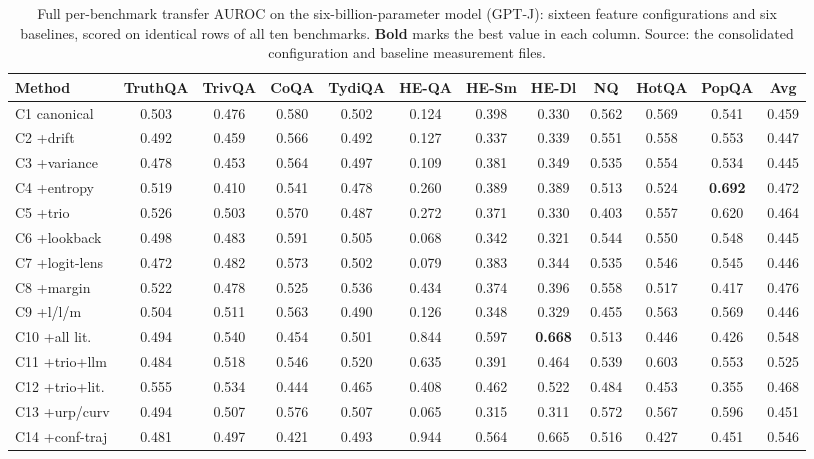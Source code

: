 \begin{table}[h]
\centering
\caption{Full per-benchmark transfer AUROC on the six-billion-parameter model (GPT-J): sixteen feature configurations and six baselines, scored on identical rows of all ten benchmarks. \textbf{Bold} marks the best value in each column. Source: the consolidated configuration and baseline measurement files.}
\label{tab:app-gptj-full}
\footnotesize
\setlength{\tabcolsep}{3.2pt}
\begin{tabular}{lcccccccccc|c}
\toprule
Method & TruthQA & TrivQA & CoQA & TydiQA & HE-QA & HE-Sm & HE-Dl & NQ & HotQA & PopQA & Avg \\
\midrule
C1 canonical & 0.503 & 0.476 & 0.580 & 0.502 & 0.124 & 0.398 & 0.330 & 0.562 & 0.569 & 0.541 & 0.459 \\
C2 {+}drift & 0.492 & 0.459 & 0.566 & 0.492 & 0.127 & 0.337 & 0.339 & 0.551 & 0.558 & 0.553 & 0.447 \\
C3 {+}variance & 0.478 & 0.453 & 0.564 & 0.497 & 0.109 & 0.381 & 0.349 & 0.535 & 0.554 & 0.534 & 0.445 \\
C4 {+}entropy & 0.519 & 0.410 & 0.541 & 0.478 & 0.260 & 0.389 & 0.389 & 0.513 & 0.524 & \textbf{0.692} & 0.472 \\
C5 {+}trio & 0.526 & 0.503 & 0.570 & 0.487 & 0.272 & 0.371 & 0.330 & 0.403 & 0.557 & 0.620 & 0.464 \\
C6 {+}lookback & 0.498 & 0.483 & 0.591 & 0.505 & 0.068 & 0.342 & 0.321 & 0.544 & 0.550 & 0.548 & 0.445 \\
C7 {+}logit-lens & 0.472 & 0.482 & 0.573 & 0.502 & 0.079 & 0.383 & 0.344 & 0.535 & 0.546 & 0.545 & 0.446 \\
C8 {+}margin & 0.522 & 0.478 & 0.525 & 0.536 & 0.434 & 0.374 & 0.396 & 0.558 & 0.517 & 0.417 & 0.476 \\
C9 {+}l/l/m & 0.504 & 0.511 & 0.563 & 0.490 & 0.126 & 0.348 & 0.329 & 0.455 & 0.563 & 0.569 & 0.446 \\
C10 {+}all lit. & 0.494 & 0.540 & 0.454 & 0.501 & 0.844 & 0.597 & \textbf{0.668} & 0.513 & 0.446 & 0.426 & 0.548 \\
C11 {+}trio{+}llm & 0.484 & 0.518 & 0.546 & 0.520 & 0.635 & 0.391 & 0.464 & 0.539 & 0.603 & 0.553 & 0.525 \\
C12 {+}trio{+}lit. & 0.555 & 0.534 & 0.444 & 0.465 & 0.408 & 0.462 & 0.522 & 0.484 & 0.453 & 0.355 & 0.468 \\
C13 {+}urp/curv & 0.494 & 0.507 & 0.576 & 0.507 & 0.065 & 0.315 & 0.311 & 0.572 & 0.567 & 0.596 & 0.451 \\
C14 {+}conf-traj & 0.481 & 0.497 & 0.421 & 0.493 & 0.944 & 0.564 & 0.665 & 0.516 & 0.427 & 0.451 & 0.546 \\

\end{tabular}
\end{table}
